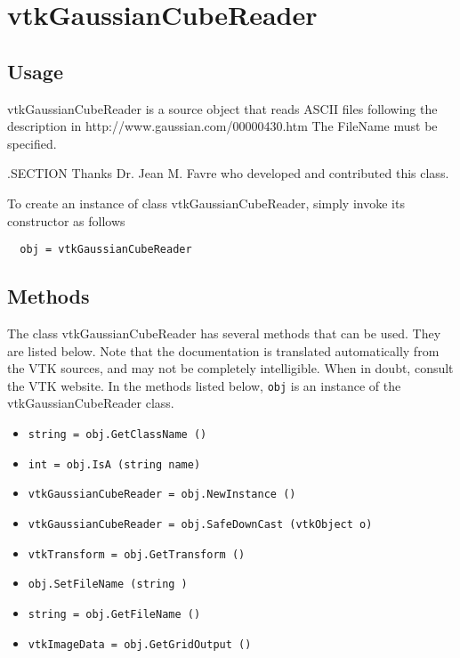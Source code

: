 \section{vtkGaussianCubeReader}

\subsection{Usage}

 vtkGaussianCubeReader is a source object that reads ASCII files following
 the description in http://www.gaussian.com/00000430.htm
 The FileName must be specified.

 .SECTION Thanks
 Dr. Jean M. Favre who developed and contributed this class.

To create an instance of class vtkGaussianCubeReader, simply
invoke its constructor as follows
\begin{verbatim}
  obj = vtkGaussianCubeReader
\end{verbatim}
\subsection{Methods}

The class vtkGaussianCubeReader has several methods that can be used.
  They are listed below.
Note that the documentation is translated automatically from the VTK sources,
and may not be completely intelligible.  When in doubt, consult the VTK website.
In the methods listed below, \verb|obj| is an instance of the vtkGaussianCubeReader class.
\begin{itemize}
\item  \verb|string = obj.GetClassName ()|

\item  \verb|int = obj.IsA (string name)|

\item  \verb|vtkGaussianCubeReader = obj.NewInstance ()|

\item  \verb|vtkGaussianCubeReader = obj.SafeDownCast (vtkObject o)|

\item  \verb|vtkTransform = obj.GetTransform ()|

\item  \verb|obj.SetFileName (string )|

\item  \verb|string = obj.GetFileName ()|

\item  \verb|vtkImageData = obj.GetGridOutput ()|

\end{itemize}
